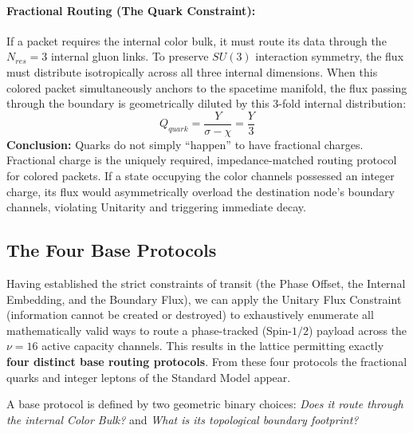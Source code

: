 \paragraph{Fractional Routing (The Quark Constraint):}
If a packet requires the internal color bulk, it must route its data through the $N_{res} = 3$ internal gluon links. To preserve $SU(3)$ interaction symmetry, the flux must distribute isotropically across all three internal dimensions. When this colored packet simultaneously anchors to the spacetime manifold, the flux passing through the boundary is geometrically diluted by this 3-fold internal distribution:
\begin{equation}
    Q_{quark} = \frac{Y}{\sigma - \chi} = \frac{Y}{3}
\end{equation}
\textbf{Conclusion:} Quarks do not simply ``happen'' to have fractional charges. Fractional charge is the uniquely required, impedance-matched routing protocol for colored packets. If a state occupying the color channels possessed an integer charge, its flux would asymmetrically overload the destination node's boundary channels, violating Unitarity and triggering immediate decay.

\subsection{The Four Base Protocols}

Having established the strict constraints of transit (the Phase Offset, the Internal Embedding, and the Boundary Flux), we can apply the Unitary Flux Constraint (information cannot be created or destroyed) to exhaustively enumerate all mathematically valid ways to route a phase-tracked (Spin-$1/2$) payload across the $\nu=16$ active capacity channels. This results in the lattice permitting exactly \textbf{four distinct base routing protocols}. From these four protocols  the fractional quarks and integer leptons of the Standard Model appear.

A base protocol is defined by two geometric binary choices: \textit{Does it route through the internal Color Bulk?} and \textit{What is its topological boundary footprint?}

